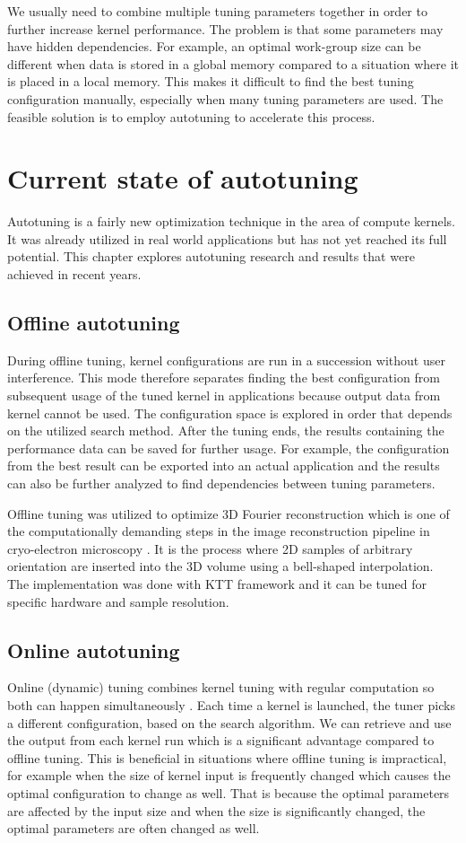 \documentclass[
  digital,     %
  oneside,     %
  nosansbold,  %
  nocolorbold, %
  lof,         %
  lot,         %
  nocover
]{fithesis4}
\begin{document}
We usually need to combine multiple tuning parameters together in order to further increase kernel performance. The problem is that some parameters may have hidden dependencies. For example, an optimal work-group size can be different when data is stored in a global memory compared to a situation where it is placed in a local memory. This makes it difficult to find the best tuning configuration manually, especially when many tuning parameters are used. The feasible solution is to employ autotuning to accelerate this process.

\chapter{Current state of autotuning}
Autotuning is a fairly new optimization technique in the area of compute kernels. It was already utilized in real world applications but has not yet reached its full potential. This chapter explores autotuning research and results that were achieved in recent years. 

\section{Offline autotuning}
During offline tuning, kernel configurations are run in a succession without user interference. This mode therefore separates finding the best configuration from subsequent usage of the tuned kernel in applications because output data from kernel cannot be used. The configuration space is explored in order that depends on the utilized search method. After the tuning ends, the results containing the performance data can be saved for further usage. For example, the configuration from the best result can be exported into an actual application and the results can also be further analyzed to find dependencies between tuning parameters.

Offline tuning was utilized to optimize 3D Fourier reconstruction which is one of the computationally demanding steps in the image reconstruction pipeline in cryo-electron microscopy \cite{strelak2019gpu}. It is the process where 2D samples of arbitrary orientation are inserted into the 3D volume using a bell-shaped interpolation. The implementation was done with KTT framework and it can be tuned for specific hardware and sample resolution.

\section{Online autotuning}
Online (dynamic) tuning combines kernel tuning with regular computation so both can happen simultaneously \cite{petrovic2020benchmark}. Each time a kernel is launched, the tuner picks a different configuration, based on the search algorithm. We can retrieve and use the output from each kernel run which is a significant advantage compared to offline tuning. This is beneficial in situations where offline tuning is impractical, for example when the size of kernel input is frequently changed which causes the optimal configuration to change as well. That is because the optimal parameters are affected by the input size and when the size is significantly changed, the optimal parameters are often changed as well.
\end{document}
